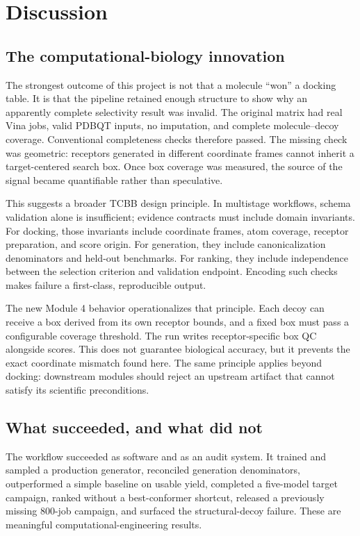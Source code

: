 \documentclass[journal]{IEEEtran}
\begin{document}
\section{Discussion}

\subsection{The computational-biology innovation}

The strongest outcome of this project is not that a molecule ``won'' a
docking table. It is that the pipeline retained enough structure to
show why an apparently complete selectivity result was invalid. The
original matrix had real Vina jobs, valid PDBQT inputs, no imputation,
and complete molecule--decoy coverage. Conventional completeness checks
therefore passed. The missing check was geometric: receptors generated
in different coordinate frames cannot inherit a target-centered search
box. Once box coverage was measured, the source of the signal became
quantifiable rather than speculative.

This suggests a broader TCBB design principle. In multistage workflows,
schema validation alone is insufficient; evidence contracts must include
domain invariants. For docking, those invariants include coordinate
frames, atom coverage, receptor preparation, and score origin. For
generation, they include canonicalization denominators and held-out
benchmarks. For ranking, they include independence between the selection
criterion and validation endpoint. Encoding such checks makes failure a
first-class, reproducible output.

The new Module 4 behavior operationalizes that principle. Each decoy can
receive a box derived from its own receptor bounds, and a fixed box must
pass a configurable coverage threshold. The run writes receptor-specific
box QC alongside scores. This does not guarantee biological accuracy,
but it prevents the exact coordinate mismatch found here. The same
principle applies beyond docking: downstream modules should reject an
upstream artifact that cannot satisfy its scientific preconditions.

\subsection{What succeeded, and what did not}

The workflow succeeded as software and as an audit system. It trained
and sampled a production generator, reconciled generation denominators,
outperformed a simple baseline on usable yield, completed a five-model
target campaign, ranked without a best-conformer shortcut, released a
previously missing 800-job campaign, and surfaced the structural-decoy
failure. These are meaningful computational-engineering results.
\end{document}
